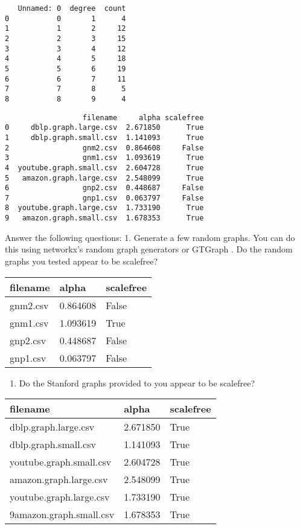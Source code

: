 \documentclass[11pt]{article}
\providecommand{\tightlist}{%
      \setlength{\itemsep}{0pt}\setlength{\parskip}{0pt}}
\begin{document}
    
    \begin{verbatim}
   Unnamed: 0  degree  count
0           0       1      4
1           1       2     12
2           2       3     15
3           3       4     12
4           4       5     18
5           5       6     19
6           6       7     11
7           7       8      5
8           8       9      4
    \end{verbatim}

    
    
    \begin{verbatim}
                  filename     alpha scalefree
0     dblp.graph.large.csv  2.671850      True
1     dblp.graph.small.csv  1.141093      True
2                 gnm2.csv  0.864608     False
3                 gnm1.csv  1.093619      True
4  youtube.graph.small.csv  2.604728      True
5   amazon.graph.large.csv  2.548099      True
6                 gnp2.csv  0.448687     False
7                 gnp1.csv  0.063797     False
8  youtube.graph.large.csv  1.733190      True
9   amazon.graph.small.csv  1.678353      True
    \end{verbatim}

    
    Answer the following questions: 1. Generate a few random graphs. You can
do this using networkx's random graph generators or GTGraph . Do the
random graphs you tested appear to be scalefree?

\begin{longtable}[]{@{}lll@{}}
\toprule
filename & alpha & scalefree\tabularnewline
\midrule
\endhead
gnm2.csv & 0.864608 & False\tabularnewline
gnm1.csv & 1.093619 & True\tabularnewline
gnp2.csv & 0.448687 & False\tabularnewline
gnp1.csv & 0.063797 & False\tabularnewline
\bottomrule
\end{longtable}

\begin{enumerate}
\def\labelenumi{\arabic{enumi}.}
\setcounter{enumi}{1}
\tightlist
\item
  Do the Stanford graphs provided to you appear to be scalefree?
\end{enumerate}

\begin{longtable}[]{@{}lll@{}}
\toprule
filename & alpha & scalefree\tabularnewline
\midrule
\endhead
dblp.graph.large.csv & 2.671850 & True\tabularnewline
dblp.graph.small.csv & 1.141093 & True\tabularnewline
youtube.graph.small.csv & 2.604728 & True\tabularnewline
amazon.graph.large.csv & 2.548099 & True\tabularnewline
youtube.graph.large.csv & 1.733190 & True\tabularnewline
9amazon.graph.small.csv & 1.678353 & True\tabularnewline
\bottomrule
\end{longtable}
\end{document}
